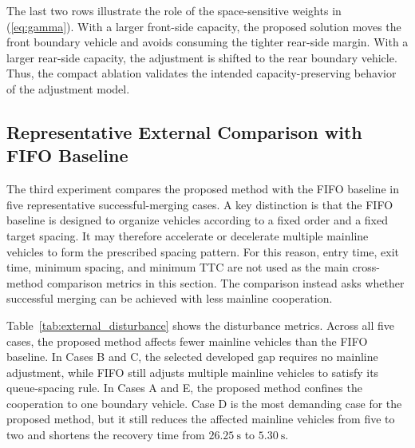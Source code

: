 \documentclass[conference]{IEEEtran}
\begin{document}
\begin{table}[t]
\caption{Capacity and Adjustment Ablation}
\label{tab:capacity_ablation}
\centering
\scriptsize
{}
\end{table}

The last two rows illustrate the role of the space-sensitive weights in
(\ref{eq:gamma}). With a larger front-side capacity, the proposed solution moves
the front boundary vehicle and avoids consuming the tighter rear-side margin.
With a larger rear-side capacity, the adjustment is shifted to the rear
boundary vehicle. Thus, the compact ablation validates the intended
capacity-preserving behavior of the adjustment model.

\subsection{Representative External Comparison with FIFO Baseline}
The third experiment compares the proposed method with the FIFO baseline in
five representative successful-merging cases. A key distinction is that the FIFO
baseline is designed to organize vehicles according to a fixed order and a
fixed target spacing. It may therefore accelerate or decelerate multiple
mainline vehicles to form the prescribed spacing pattern. For this reason,
entry time, exit time, minimum spacing, and minimum TTC are not used as the main
cross-method comparison metrics in this section. The comparison instead asks
whether successful merging can be achieved with less mainline cooperation.

Table~\ref{tab:external_disturbance} shows the disturbance metrics. Across all
five cases, the proposed method affects fewer mainline vehicles than the FIFO
baseline. In Cases B and C, the selected developed gap requires no mainline
adjustment, while FIFO still adjusts multiple mainline vehicles to satisfy its
queue-spacing rule. In Cases A and E, the proposed method confines the
cooperation to one boundary vehicle. Case D is the most demanding case for the
proposed method, but it still reduces the affected mainline vehicles from five
to two and shortens the recovery time from \(26.25~\mathrm{s}\) to
\(5.30~\mathrm{s}\).
\end{document}
